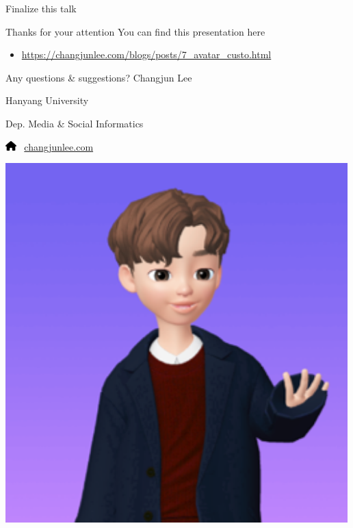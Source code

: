 \documentclass[
  ignorenonframetext,
]{beamer}
\providecommand{\tightlist}{%
  \setlength{\itemsep}{0pt}\setlength{\parskip}{0pt}}\usepackage{longtable,booktabs,array}
\begin{document}
\begin{frame}{Finalize this talk}
\protect\hypertarget{finalize-this-talk}{}
\begin{block}{Thanks for your attention}
\protect\hypertarget{thanks-for-your-attention}{}
You can find this presentation here

\begin{itemize}
\tightlist
\item
  \url{https://changjunlee.com/blogs/posts/7_avatar_custo.html}
\end{itemize}
\end{block}

\begin{block}{Any questions \& suggestions?}
\protect\hypertarget{any-questions-suggestions}{}
Changjun Lee

Hanyang University

Dep. Media \& Social Informatics

\includegraphics[width=1.12em,height=1em]{index_files/figure-beamer/fa-icon-9de8c0f3cb50e30659d3ab543abf8bca.pdf}
~\href{https://changjunlee.com/}{changjunlee.com}

\includegraphics[width=5.20833in,height=\textheight]{img/my_avatar.png}
\end{block}
\end{frame}
\end{document}
